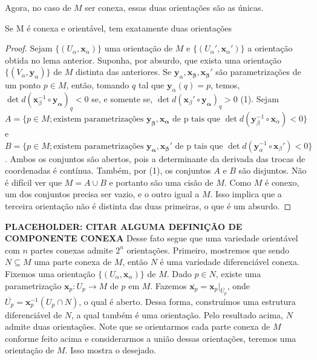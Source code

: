 	Agora, no caso de $M$ ser conexa, essas duas orientações são as únicas.
	\begin{proposition}
		\label{prop:duas-orientacoes}
		Se M é conexa e orientável, tem exatamente duas orientações
		\begin{proof}

			Sejam $\{ (U_{\alpha}, \mathbf{x}_{\alpha}) \}$ uma orientação de $M$ e $\{ (U_{\alpha}', \mathbf{x}_{\alpha}') \}$ a orientação obtida no lema anterior. Suponha, por absurdo, que exista uma orientação $\{ (V_{\alpha}, \mathbf{y}_{\alpha}) \}$ de $M$ distinta das anteriores. Se $\mathbf{y}_{\alpha}, \mathbf{x_{\beta}, \mathbf{x}_{\beta}'}$ são parametrizações de um ponto $p \in M$, então, tomando $q$ tal que $\mathbf{y}_{\alpha}(q)=p$, temos, $\det d(\mathbf{x}_{\beta}^{-1} \circ \mathbf{y_{\alpha}})_{q}<0$ se, e somente se, $\det d(\mathbf{x}_{\beta}'\circ \mathbf{y_{\alpha}})_{q}>0$ (1).
			Sejam $A=\{ p \in M; \text{existem parametrizações } \mathbf{y_{\beta}} , \mathbf{x_{\alpha}} \text{  de p tais que }\det d(\mathbf{y}_{\beta}^{-1} \circ \mathbf{x}_{\alpha})<0\}$ e $B=\{ p \in M; \text{existem parametrizações } \mathbf{y_{\alpha}} , \mathbf{x_{\beta}'} \text{  de p tais que }\det d(\mathbf{y}_{\alpha}^{-1} \circ \mathbf{x}_{\beta}')<0\}$.
			Ambos os conjuntos são abertos, pois a determinante da derivada das trocas de coordenadas é contínua. Também, por (1), os conjuntos $A$ e $B$ são disjuntos. Não é difícil ver que $M=A \cup B$ e portanto são uma cisão de $M$. Como $M$ é conexo, um dos conjuntos precisa ser vazio, e o outro igual a $M$. Isso implica que a terceira orientação não é distinta das duas primeiras, o que é um absurdo.
		\end{proof}
	\end{proposition}
	\textbf{PLACEHOLDER: CITAR ALGUMA DEFINIÇÃO DE COMPONENTE CONEXA}
	Desse fato segue que uma variedade orientável com $n$ partes conexas admite $2^{n}$ orientações. Primeiro, mostremos que sendo $N \subseteq M$ uma parte conexa de $M$, então $N$ é uma variedade diferenciável conexa. Fixemos uma orientação $\{ (U_{\alpha}, \mathbf{x}_{\alpha}) \}$ de $M$. Dado $p \in N$, existe uma parametrização $\mathbf{x}_{p}:U_{p}\to M$ de $p$ em $M$. Fazemos $\overline{\mathbf{x}_{p}}=\mathbf{x}_{p}|_{\overline{U_{p}}}$, onde $\overline{U_{p}}=\mathbf{x}_{p}^{-1}(U_{p}\cap N)$, o qual é aberto. Dessa forma, construímos uma estrutura diferenciável de $N$, a qual também é uma orientação. Pelo resultado acima, $N$ admite duas orientações. Note que se orientarmos cada parte conexa de $M$ conforme feito acima e considerarmos a união dessas orientações, teremos uma orientação de $M$. Isso mostra o desejado.

